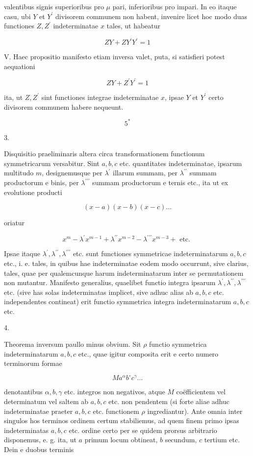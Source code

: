 \documentclass[twoside,12pt, showframe]{memoir}
\begin{document}
valentibus signis superioribus pro \(\mu\) pari, inferioribus pro impari. In eo itaque casu, ubi \(Y\) et \(Y^{\prime}\) divisorem communem non habent, invenire licet hoc modo duas functiones \(Z, Z^{\prime}\) indeterminatae \(x\) tales, ut habeatur

\[
Z Y+Z Y^{\prime} Y^{\prime}=1
\]

V. Haec propositio manifesto etiam inversa valet, puta, si satisfieri potest aequationi

\[
Z Y+Z^{\prime} Y^{\prime}=1
\]

ita, ut \(Z, Z^{\prime}\) sint functiones integrae indeterminatae \(x\), ipsae \(Y\) et \(Y^{\prime}\) certo divisorem communem habere nequeunt.

\[
5^{*}
\]

3.

Disquisitio praeliminaris altera circa transformationem functionum symmetricarum versabitur. Sint \(a, b, c\) etc. quantitates indeterminatae, ipsarum multitudo \(m\), designemusque per \(\lambda^{\prime}\) illarum summam, per \(\lambda^{\prime \prime}\) summam productorum \(\mathrm{e}\) binis, per \(\lambda^{\prime \prime \prime}\) summam productorum e ternis etc., ita ut ex evolutione producti

\[
(x-a)(x-b)(x-c) \ldots
\]

oriatur

\[
x^{m}-\lambda^{\prime} x^{m-1}+\lambda^{\prime \prime} x^{m-2}-\lambda^{\prime \prime \prime} x^{m-3}+\text { etc. }
\]

Ipsae itaque \(\lambda^{\prime}, \lambda^{\prime \prime}, \lambda^{\prime \prime \prime}\) etc. sunt functiones symmetricae indeterminatarum \(a, b, c\) etc., i. e. tales, in quibus hae indeterminatae eodem modo occurrunt, sive clarius, tales, quae per qualemcunque harum indeterminatarum inter se permutationem non mutantur. Manifesto generalius, quaelibet functio integra ipsarum \(\lambda^{\prime}, \lambda^{\prime \prime}, \lambda^{\prime \prime \prime}\) etc. (sive has solas indeterminatas implicet, sive adhuc alias ab \(a, b, c\) etc. independentes contineat) erit functio symmetrica integra indeterminatarum \(a, b, c\) etc.

4.

Theorema inversum paullo minus obvium. Sit \(\rho\) functio symmetrica indeterminatarum \(a, b, c\) etc., quae igitur composita erit e certo numero terminorum formae

\[
M a^{\alpha} b^{\circ} c^{\gamma} \ldots
\]

denotantibus \(\alpha, b, \gamma\) etc. integros non negativos, atque \(M\) coëfficientem vel determinatum vel saltem ab \(a, b, c\) etc. non pendentem (si forte aliae adhuc indeterminatae praeter \(a, b, c\) etc. functionem \(\rho\) ingrediantur). Ante omnia inter singulos hos terminos ordinem certum stabiliemus, ad quem finem primo ipsas indeterminatas \(a, b, c\) etc. ordine certo per se quidem prorsus arbitrario disponemus, e. g. ita, ut \(a\) primum locum obtineat, \(b\) secundum, \(c\) tertium etc. Dein e duobus terminis
\end{document}
